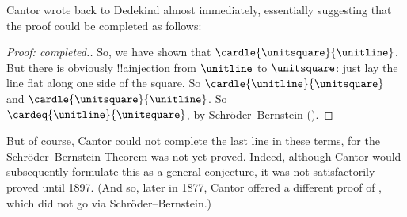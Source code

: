 \documentclass[../../../include/open-logic-section]{subfiles}
\begin{document}
Cantor wrote back to Dedekind almost immediately, essentially suggesting that the proof could be completed as follows:
\begin{proof}[Proof: completed.] 
	So, we have shown that $\cardle{\unitsquare}{\unitline}$. But there is obviously !!a{injection} from $\unitline$ to $\unitsquare$: just lay the line flat along one side of the square. So $\cardle{\unitline}{\unitsquare}$ and $\cardle{\unitsquare}{\unitline}$. So $\cardeq{\unitline}{\unitsquare}$, by Schr\"{o}der--Bernstein ().
\end{proof}\noindent 
But of course, Cantor could not complete the last line in these terms, for the Schr\"{o}der--Bernstein Theorem was not yet proved. Indeed, although Cantor would subsequently formulate this as a general conjecture, it was not satisfactorily proved until 1897. (And so, later in 1877, Cantor offered a different proof of , which did not go via Schr\"{o}der--Bernstein.)
\end{document}
